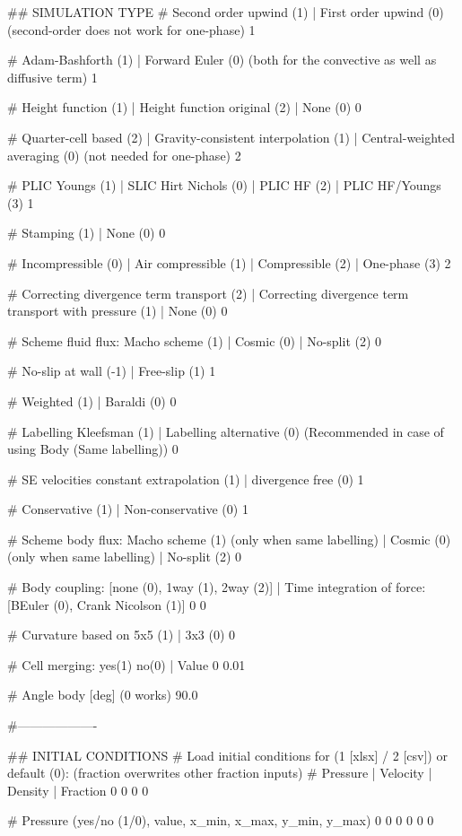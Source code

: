 ## SIMULATION TYPE
# Second order upwind (1)	| First order upwind (0) (second-order does not work for one-phase)
1

# Adam-Bashforth (1)	| Forward Euler (0) (both for the convective as well as diffusive term)
1

# Height function (1)	| Height function original (2) | None (0)
0

# Quarter-cell based (2) | Gravity-consistent interpolation (1)	|	Central-weighted averaging (0) (not needed for one-phase)
2

# PLIC Youngs (1)	| SLIC Hirt Nichols (0) | PLIC HF (2) | PLIC HF/Youngs (3)
1

# Stamping (1)	| None (0)
0

# Incompressible (0)	| Air compressible (1)	| Compressible (2) | One-phase (3)
2

# Correcting divergence term transport (2) | Correcting divergence term transport with pressure (1) | None (0)
0

# Scheme fluid flux: Macho scheme (1)	|  Cosmic (0) | No-split (2)
0

# No-slip at wall (-1)	| Free-slip (1)
1

# Weighted (1) | Baraldi (0)
0

# Labelling Kleefsman (1) | Labelling alternative (0) (Recommended in case of using Body (Same labelling))
0

# SE velocities constant extrapolation (1) | divergence free (0)
1

# Conservative (1) | Non-conservative (0)
1

# Scheme body flux: Macho scheme (1) (only when same labelling) | Cosmic (0) (only when same labelling) | No-split (2)
0

# Body coupling: [none (0), 1way (1), 2way (2)] | Time integration of force: [BEuler (0), Crank Nicolson (1)]
0 0

# Curvature based on 5x5 (1) | 3x3 (0)
0

# Cell merging: yes(1) no(0) | Value
0 0.01

# Angle body [deg] (0 works)
90.0

#-------------------

## INITIAL CONDITIONS
# Load initial conditions for (1 [xlsx] / 2 [csv]) or default (0): (fraction overwrites other fraction inputs)
# Pressure 		| Velocity		| Density		| Fraction
0   0   0   0

# Pressure (yes/no (1/0), value, x_min, x_max, y_min, y_max)
0 0 0 0 0 0

